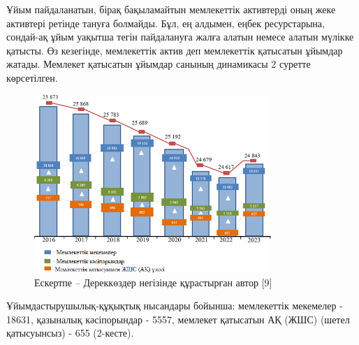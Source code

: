 \begin{multicols}{2}
Ұйым пайдаланатын, бірақ бақыламайтын мемлекеттік активтерді оның жеке
активтері ретінде тануға болмайды. Бұл, ең алдымен, еңбек ресурстарына,
сондай-ақ ұйым уақытша тегін пайдалануға жалға алатын немесе алатын
мүлікке қатысты. Өз кезегінде, мемлекеттік актив деп мемлекеттік
қатысатын ұйымдар жатады. Мемлекет қатысатын ұйымдар санының динамикасы
2 суретте көрсетілген.
\end{multicols}

\begin{figure}[H]
	\centering
	\includegraphics[width=0.8\textwidth]{media/ekon/image2}
	\caption*{2 - сурет. Мемлекет қатысатын ұйымдар санының динамикасы}
	\caption*{Ескертпе -- Дереккөздер негізінде құрастырған автор {[}9{]}}
\end{figure}

Ұйымдастырушылық-құқықтық нысандары бойынша: мемлекеттік мекемелер -
18631, қазыналық кәсіпорындар - 5557, мемлекет қатысатын АҚ (ЖШС) (шетел
қатысуынсыз) - 655 (2-кесте).

